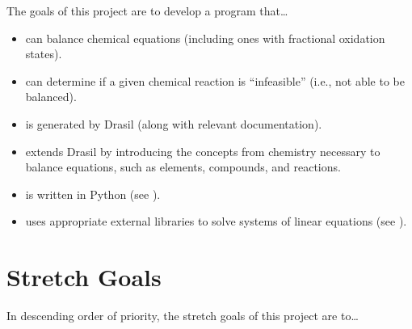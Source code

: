 \documentclass{article}
\begin{document}
The goals of this project are to develop a program that\dots

\begin{itemize}
    \item can balance chemical equations (including ones with fractional
    oxidation states).
    \item can determine if a given chemical reaction is ``infeasible'' (i.e.,
    not able to be balanced).
    \item is generated by Drasil (along with relevant documentation).
    \item extends Drasil by introducing the concepts from chemistry necessary
    to balance equations, such as elements, compounds, and reactions.
    \item is written in Python (see ).
    \item uses appropriate external libraries to
    solve systems of linear equations (see \cite[Ch. 4]{chen_solving_2022}).
\end{itemize}

\newpage

\section{Stretch Goals}

In descending order of priority, the stretch goals of this project are to\dots
\end{document}

